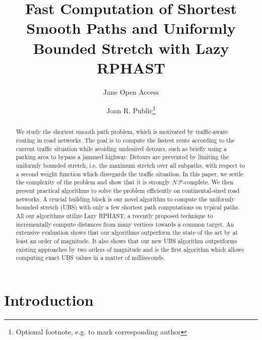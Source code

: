 \documentclass[a4paper,UKenglish,cleveref, autoref, thm-restate]{lipics-v2021}
\title{Fast Computation of Shortest Smooth Paths and Uniformly Bounded Stretch with Lazy RPHAST} %
\author{Jane {Open Access}}{Dummy University Computing Laboratory, [optional: Address], Country \and My second affiliation, Country \and \url{http://www.myhomepage.edu} }{johnqpublic@dummyuni.org}{https://orcid.org/0000-0002-1825-0097}{(Optional) author-specific funding acknowledgements}%
\author{Joan R. Public\footnote{Optional footnote, e.g. to mark corresponding author}}{Department of Informatics, Dummy College, [optional: Address], Country}{joanrpublic@dummycollege.org}{[orcid]}{[funding]}
\begin{document}
\maketitle

\begin{abstract}
We study the shortest smooth path problem, which is motivated by traffic-aware routing in road networks.
The goal is to compute the fastest route according to the current traffic situation while avoiding undesired detours, such as briefly using a parking area to bypass a jammed highway.
Detours are prevented by limiting the uniformly bounded stretch, i.e. the maximum stretch over all subpaths, with respect to a second weight function which disregards the traffic situation.
In this paper, we settle the complexity of the problem and show that it is strongly $\mathcal{NP}$-complete.
We then present practical algorithms to solve the problem efficiently on continental-sized road networks.
A crucial building block is our novel algorithm to compute the uniformly bounded stretch (UBS) with only a few shortest path computations on typical paths.
All our algorithms utilize Lazy RPHAST, a recently proposed technique to incrementally compute distances from many vertices towards a common target.
An extensive evaluation shows that our algorithms outperform the state of the art by at least an order of magnitude.
It also shows that our new UBS algorithm outperforms existing approaches by two orders of magnitude and is the first algorithm which allows computing exact UBS values in a matter of milliseconds.

\end{abstract}

\newpage

\section{Introduction}
\end{document}
